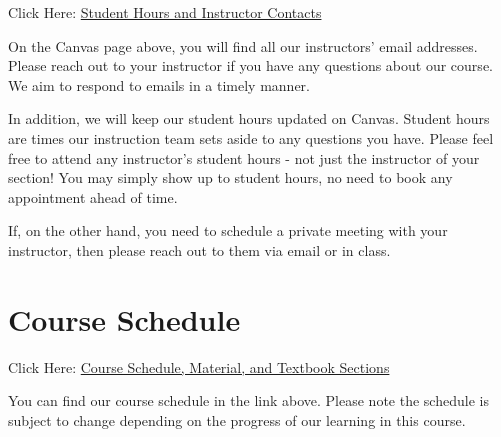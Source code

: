 \documentclass[12pt]{article}
\begin{document}
        Click Here: \href{https://canvas.its.virginia.edu/courses/177534/pages/student-hours-and-instructor-contacts}{Student Hours and Instructor Contacts}

        On the Canvas page above, you will find all our instructors' email addresses. Please reach out to your instructor if you have any questions about our course. We aim to respond to emails in a timely manner.


        
		

        In addition, we will keep our student hours updated on Canvas. Student hours are times our instruction team sets aside to any questions you have. Please feel free to attend any instructor's student hours - not just the instructor of your section! You may simply show up to student hours, no need to book any appointment ahead of time. 
        
        If, on the other hand, you need to schedule a private meeting with your instructor, then please reach out to them via email or in class.

	\section{Course Schedule}

        Click Here: \href{https://canvas.its.virginia.edu/courses/177534}{Course Schedule, Material, and Textbook Sections}
        
        You can find our course schedule in the link above. Please note the schedule is subject to change depending on the progress of our learning in this course.
\end{document}
